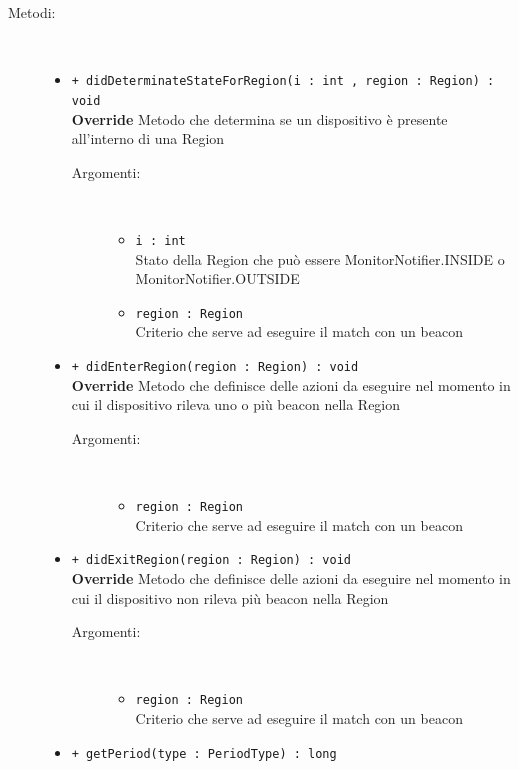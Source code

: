 \documentclass[../DefinizioneDiProdotto.tex]{subfiles}
\begin{document}
\begin{description}
\begin{itemize}
	\end{itemize}
	\item[Metodi:] \
	\begin{itemize}
		\item \texttt{+ didDeterminateStateForRegion(i : int , region : Region) : void}\\
		\textbf{Override} Metodo che determina se un dispositivo è presente all'interno di una Region
		\begin{description}
			\item[Argomenti:] \
			\begin{itemize}
				\item \texttt{i : int }\\
				Stato della Region che può essere MonitorNotifier.INSIDE o MonitorNotifier.OUTSIDE\item \texttt{region : Region}\\
				Criterio che serve ad eseguire il match con un beacon\end{itemize}
		\end{description}
		\item \texttt{+ didEnterRegion(region : Region) : void}\\
		\textbf{Override} Metodo che definisce delle azioni da eseguire nel momento in cui il dispositivo rileva uno o più beacon nella Region
		\begin{description}
			\item[Argomenti:] \
			\begin{itemize}
				\item \texttt{region : Region}\\
				Criterio che serve ad eseguire il match con un beacon\end{itemize}
		\end{description}
		\item \texttt{+ didExitRegion(region : Region) : void}\\
		\textbf{Override} Metodo che definisce delle azioni da eseguire nel momento in cui il dispositivo non rileva più beacon nella Region
		\begin{description}
			\item[Argomenti:] \
			\begin{itemize}
				\item \texttt{region : Region}\\
				Criterio che serve ad eseguire il match con un beacon\end{itemize}
		\end{description}
		\item \texttt{+ getPeriod(type : PeriodType) : long}\\

\end{itemize}
\end{description}
\end{document}
